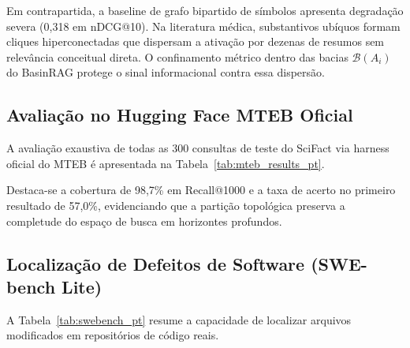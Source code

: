 \documentclass[10pt,twocolumn]{article}
\theoremstyle{definition}
\begin{document}
Em contrapartida, a baseline de grafo bipartido de símbolos apresenta degradação severa (0,318 em nDCG@10). Na literatura médica, substantivos ubíquos formam cliques hiperconectadas que dispersam a ativação por dezenas de resumos sem relevância conceitual direta. O confinamento métrico dentro das bacias $\mathcal{B}(A_i)$ do BasinRAG protege o sinal informacional contra essa dispersão.

\subsection{Avaliação no Hugging Face MTEB Oficial}

A avaliação exaustiva de todas as 300 consultas de teste do SciFact via harness oficial do MTEB é apresentada na Tabela~\ref{tab:mteb_results_pt}.

\begin{table}[t]
\centering
\caption{Resultados oficiais na suíte MTEB SciFact ($k \le 1000$).}
\label{tab:mteb_results_pt}
\end{table}

Destaca-se a cobertura de 98,7\% em Recall@1000 e a taxa de acerto no primeiro resultado de 57,0\%, evidenciando que a partição topológica preserva a completude do espaço de busca em horizontes profundos.

\subsection{Localização de Defeitos de Software (SWE-bench Lite)}

A Tabela~\ref{tab:swebench_pt} resume a capacidade de localizar arquivos modificados em repositórios de código reais.
\end{document}
